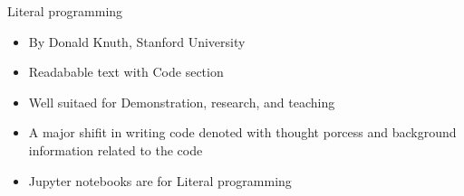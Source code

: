 \begin{frame}{Literal programming}
	\begin{beamerboxesrounded}{}
		\begin{itemize}
			\item By Donald Knuth, Stanford University
			\item Readabable text with Code section
			\item Well suitaed for Demonstration, research, and teaching 
			\item A major shifit in writing code denoted with thought porcess and background information related to the code 
			\item Jupyter notebooks are for Literal programming
		\end{itemize}
	\end{beamerboxesrounded}
\end{frame}

